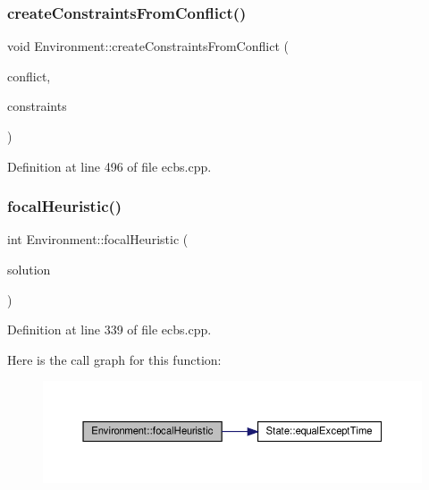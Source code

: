 \subsubsection{\texorpdfstring{create\+Constraints\+From\+Conflict()}{createConstraintsFromConflict()}\hspace{0.1cm}{\footnotesize\ttfamily [2/2]}}
{\footnotesize\ttfamily void Environment\+::create\+Constraints\+From\+Conflict (\begin{DoxyParamCaption}\item[{const \hyperlink{struct_conflict}{Conflict} \&}]{conflict,  }\item[{std\+::map$<$ size\+\_\+t, \hyperlink{struct_constraints}{Constraints} $>$ \&}]{constraints }\end{DoxyParamCaption})\hspace{0.3cm}{\ttfamily [inline]}}



Definition at line 496 of file ecbs.\+cpp.

\mbox{\label{class_environment_a54d9038dd600b904b73936273d711fd0}} 
\subsubsection{\texorpdfstring{focal\+Heuristic()}{focalHeuristic()}}
{\footnotesize\ttfamily int Environment\+::focal\+Heuristic (\begin{DoxyParamCaption}\item[{const std\+::vector$<$ \hyperlink{structlib_multi_robot_planning_1_1_plan_result}{Plan\+Result}$<$ \hyperlink{struct_state}{State}, \hyperlink{a__star_8cpp_a8bb1ef53467e4f61410d12822d922498}{Action}, int $>$ $>$ \&}]{solution }\end{DoxyParamCaption})\hspace{0.3cm}{\ttfamily [inline]}}



Definition at line 339 of file ecbs.\+cpp.

Here is the call graph for this function\+:
\nopagebreak
\begin{figure}[H]
\begin{center}
\leavevmode
\includegraphics[width=350pt]{class_environment_a54d9038dd600b904b73936273d711fd0_cgraph}
\end{center}
\end{figure}
\mbox{\label{class_environment_a2ed02c2b1a21ae2aabb0e1758e945540}} 
